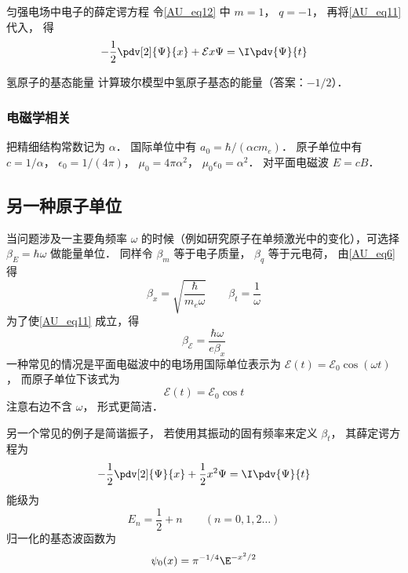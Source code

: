 \begin{example}{匀强电场中电子的薛定谔方程}
令\autoref{AU_eq12} 中 $m = 1$， $q = -1$， 再将\autoref{AU_eq11} 代入， 得
\begin{equation}
-\frac12 \pdv[2]{\Psi}{x} + \mathcal{E} x \Psi= \I\pdv{\Psi}{t}
\end{equation}
\end{example}

\begin{exercise}{氢原子的基态能量}
计算玻尔模型中氢原子基态的能量（答案：$-1/2$）．
\end{exercise}

\subsubsection{电磁学相关}
把精细结构常数记为 $\alpha$． 国际单位中有 $a_0 = \hbar/(\alpha c m_e)$． 原子单位中有 $c = 1/\alpha$， $\epsilon_0 = 1/(4\pi)$， $\mu_0 = 4\pi\alpha^2$， $\mu_0\epsilon_0 = \alpha^2$． 对平面电磁波 $E = cB$．  

\subsection{另一种原子单位}

当问题涉及一主要角频率 $\omega$ 的时候（例如研究原子在单频激光中的变化），可选择 $\beta_E = \hbar\omega$ 做能量单位． 同样令 $\beta_m$ 等于电子质量， $\beta_q$ 等于元电荷， 由\autoref{AU_eq6} 得
\begin{equation}\label{AU_eq15}
\beta_x = \sqrt{\frac{\hbar}{m_e\omega}}
\qquad
\beta_t = \frac{1}{\omega}
\end{equation}
为了使\autoref{AU_eq11} 成立，得
\begin{equation}
\beta_\mathcal{E} = \frac{\hbar\omega}{e \beta_x}
\end{equation}
一种常见的情况是平面电磁波中的电场用国际单位表示为 $\mathcal{E}(t) = \mathcal{E}_0\cos(\omega t)$， 而原子单位下该式为
\begin{equation}
\mathcal{E}(t) = \mathcal{E}_0\cos t
\end{equation}
注意右边不含 $\omega$， 形式更简洁．

另一个常见的例子是简谐振子， 若使用其振动的固有频率来定义 $\beta_t$， 其薛定谔方程为
\begin{equation}\label{AU_eq18}
-\frac12 \pdv[2]{\Psi}{x} + \frac12 x^2 \Psi= \I\pdv{\Psi}{t}
\end{equation}
能级为
\begin{equation}\label{AU_eq19}
E_n = \frac12 + n \qquad (n = 0, 1, 2\dots)
\end{equation}
归一化的基态波函数为
\begin{equation}
\psi_0(x) = \pi^{-1/4} \E^{-x^2/2}
\end{equation}

